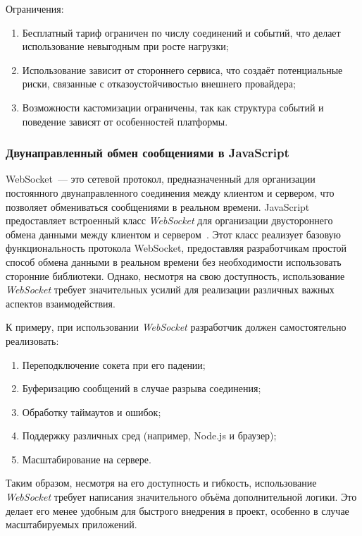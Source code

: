 Ограничения:
\begin{enumerate}
  \item Бесплатный тариф ограничен по числу соединений и событий, что делает использование невыгодным при росте нагрузки;
  \item Использование зависит от стороннего сервиса, что создаёт потенциальные риски, связанные с отказоустойчивостью внешнего провайдера;
  \item Возможности кастомизации ограничены, так как структура событий и поведение зависят от особенностей платформы.
\end{enumerate}

\subsubsection*{Двунаправленный обмен сообщениями в JavaScript}

WebSocket~--- это сетевой протокол, предназначенный для организации постоянного двунаправленного соединения между клиентом и сервером, что позволяет обмениваться сообщениями в реальном времени. JavaScript предоставляет встроенный класс \textit{WebSocket} для организации двустороннего обмена данными между клиентом и сервером~\cite{mdn_websocket_api}. Этот класс реализует базовую функциональность протокола WebSocket, предоставляя разработчикам простой способ обмена данными в реальном времени без необходимости использовать сторонние библиотеки. Однако, несмотря на свою доступность, использование \textit{WebSocket} требует значительных усилий для реализации различных важных аспектов взаимодействия.

К примеру, при использовании \textit{WebSocket} разработчик должен самостоятельно реализовать:
\begin{enumerate}
  \item Переподключение сокета при его падении;
  \item Буферизацию сообщений в случае разрыва соединения;
  \item Обработку таймаутов и ошибок;
  \item Поддержку различных сред (например, Node.js и браузер);
  \item Масштабирование на сервере.
\end{enumerate}

Таким образом, несмотря на его доступность и гибкость, использование \textit{WebSocket} требует написания значительного объёма дополнительной логики. Это делает его менее удобным для быстрого внедрения в проект, особенно в случае масштабируемых приложений.

